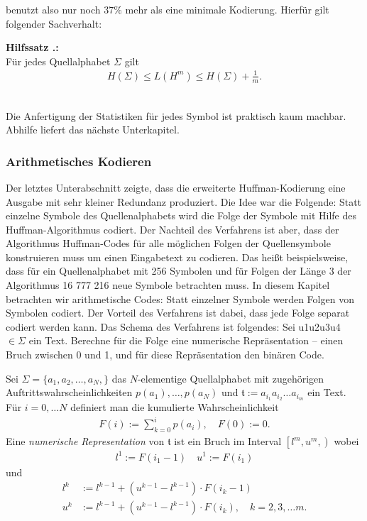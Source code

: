 \documentclass[a4paper,12pt]{article}
\newcounter{Hilfssatz}
\newcounter{Algorithmus}
\newenvironment{Hilfssatz}{
\medskip
        
        \setlength{\parindent}{0pt}
        \addtocounter{Hilfssatz}{1}
        \textbf{\textsf{Hilfssatz \thesubsection.\theHilfssatz}:}\\}{
        \nopagebreak
        \vspace{-1.0ex}
        \bigskip\\
}
\begin{document}
benutzt also nur noch $37\%$ mehr als eine minimale Kodierung.
Hierfür gilt folgender Sachverhalt:
\begin{Hilfssatz}
Für jedes Quellalphabet $\Sigma$ gilt
\begin{align*}
H(\Sigma)\leq L(H^m) \leq H(\Sigma) + \frac{1}{m}.
\end{align*}
\end{Hilfssatz}
Die Anfertigung der Statistiken für jedes Symbol ist praktisch kaum machbar. Abhilfe liefert das nächste Unterkapitel.
\subsubsection{Arithmetisches Kodieren}
Der letztes Unterabschnitt zeigte, dass die erweiterte Huffman-Kodierung eine Ausgabe mit sehr kleiner Redundanz produziert. Die Idee war die Folgende: Statt einzelne Symbole des Quellenalphabets wird die Folge der Symbole mit Hilfe des Huffman-Algorithmus codiert. Der Nachteil des Verfahrens ist aber, dass der Algorithmus Huffman-Codes für alle möglichen Folgen der Quellensymbole konstruieren muss um einen Eingabetext zu codieren. Das heißt beispielsweise, dass für ein Quellenalphabet mit 256 Symbolen und für Folgen der Länge 3 der Algorithmus 16 777 216 neue Symbole betrachten muss. In diesem Kapitel betrachten wir  arithmetische Codes: Statt einzelner Symbole werden Folgen von Symbolen codiert. Der Vorteil des Verfahrens ist dabei, dass jede Folge separat codiert werden kann. Das Schema des Verfahrens ist folgendes: Sei u1u2u3u4 $\in\Sigma$ ein Text. Berechne für die Folge eine numerische Repräsentation – einen Bruch zwischen 0 und 1, und für diese Repräsentation den binären Code. 
\par
Sei $\Sigma = \{a_{1},a_{2},\ldots,a_{N},\}$ das $N$-elementige Quellalphabet mit zugehörigen Auftrittswahrscheinlichkeiten $p(a_1),\ldots , p(a_N)$ und $\mathfrak{t}:=a_{i_1}a_{i_2}\ldots a_{i_m}$ ein Text. Für $i=0,\ldots N$ definiert man die kumulierte Wahrscheinlichkeit
\begin{align*}
F(i):=\sum_{k=0}^{i}p(a_i),\quad F(0):=0.
\end{align*}
Eine {\it numerische Representation} von $\mathfrak{t}$ ist ein Bruch im Interval $\left.\left[l^{m} ,  u^{m},\right.\right)$ wobei
\begin{align*}
l^{1}:=F(i_1 -1)\quad u^1:=F(i_1)
\end{align*}
und
\begin{align*}
l^{k}&:=l^{k-1} + \left( u^{k-1} - l^{k-1}\right) \cdot F(i_{k} - 1)
\\
u^{k}&:=l^{k-1} + \left( u^{k-1} - l^{k-1}\right) \cdot F(i_{k}),\quad k=2,3,\ldots m.
\end{align*}
\end{document}
